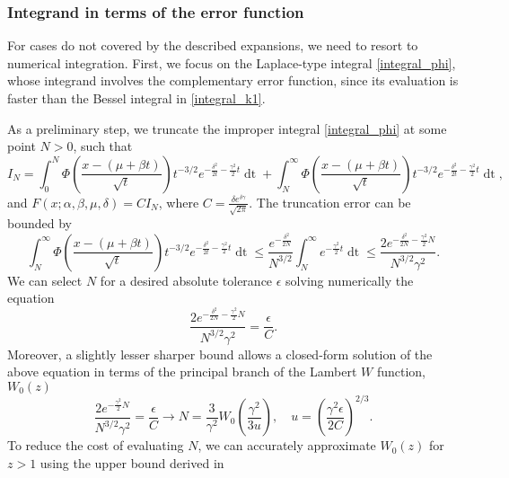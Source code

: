 \documentclass[10pt,a4paper,oneside]{article}
\numberwithin{equation}{section}
\begin{document}
\subsubsection{Integrand in terms of the error function}

For cases do not covered by the described expansions, we need to resort to numerical integration. First, we focus on the Laplace-type integral \eqref{integral_phi}, whose integrand involves the complementary error function, since its evaluation is faster than the Bessel integral in \eqref{integral_k1}.

As a preliminary step, we truncate the improper integral \eqref{integral_phi} at some point $N > 0$, such that
\begin{equation}\label{truncated_integral}
I_N = \int_0^N \Phi\left(\frac{x - (\mu +\beta t)}{\sqrt{t}}\right) t^{-3/2} e^{-\frac{\delta^2}{2t} - \frac{\gamma^2}{2}t} \mathop{dt} + \int_N^{\infty} \Phi\left(\frac{x - (\mu +\beta t)}{\sqrt{t}}\right) t^{-3/2} e^{-\frac{\delta^2}{2t} - \frac{\gamma^2}{2}t} \mathop{dt},
\end{equation}
and $F(x; \alpha, \beta, \mu, \delta) = C I_N$, where $C = \frac{\delta e^{\delta \gamma}}{\sqrt{2\pi}}$. The truncation error can be bounded by
\begin{equation}
\int_N^{\infty} \Phi\left(\frac{x - (\mu +\beta t)}{\sqrt{t}}\right) t^{-3/2} e^{-\frac{\delta^2}{2t} - \frac{\gamma^2}{2}t} \mathop{dt} \le \frac{e^{-\frac{\delta^2}{2N}}}{N^{3/2}}\int_N^{\infty} e^{- \frac{\gamma^2}{2}t} \mathop{dt} \le \frac{2 e^{-\frac{\delta^2}{2N} - \frac{\gamma^2}{2}N}}{N^{3/2} \gamma^2}.
\end{equation}
We can select $N$ for a desired absolute tolerance $\epsilon$ solving numerically the equation
\begin{equation}
\frac{2 e^{-\frac{\delta^2}{2N} - \frac{\gamma^2}{2}N}}{N^{3/2} \gamma^2} = \frac{\epsilon}{C}.
\end{equation}
Moreover, a slightly lesser sharper bound allows a closed-form solution of the above equation in terms of the principal branch of the Lambert $W$ function, $W_0(z)$
\begin{equation}\label{N_equation}
\frac{2 e^{- \frac{\gamma^2}{2}N}}{N^{3/2} \gamma^2} = \frac{\epsilon}{C} \longrightarrow N = \frac{3}{\gamma^2}W_0\left(\frac{\gamma^2}{3u}\right), \quad u = \left(\frac{\gamma^2 \epsilon}{2 C}\right)^{2/3}.
\end{equation}
To reduce the cost of evaluating $N$, we can accurately approximate $W_0(z)$ for $z > 1$ using the upper bound derived in \cite{Hoorfar2008}
\end{document}

